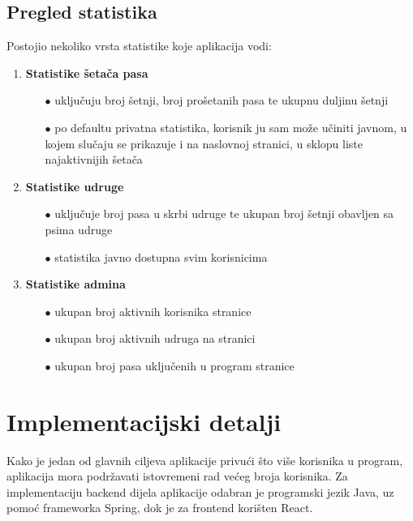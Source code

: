         \subsection{Pregled statistika}
        Postojio nekoliko vrsta statistike koje aplikacija vodi:
            \begin{enumerate}
                \item \textbf{Statistike šetača pasa}
                    \begin{enumerate}
                        \item[$\bullet$] uključuju broj šetnji, broj prošetanih pasa te ukupnu duljinu šetnji
                        \item[$\bullet$] po defaultu privatna statistika, korisnik ju sam može učiniti javnom, u kojem slučaju se prikazuje i na naslovnoj stranici, u sklopu liste najaktivnijih šetača
                    \end{enumerate}
                
                \item \textbf{Statistike udruge}
                    \begin{enumerate}
                        \item[$\bullet$] uključuje broj pasa u skrbi udruge te ukupan broj šetnji obavljen sa psima udruge
                        \item[$\bullet$] statistika javno dostupna svim korisnicima
                    \end{enumerate}
                    
                \item \textbf{Statistike admina}
                    \begin{enumerate}
                        \item[$\bullet$] ukupan broj aktivnih korisnika stranice
                        \item[$\bullet$] ukupan broj aktivnih udruga na stranici
                        \item[$\bullet$] ukupan broj pasa uključenih u program stranice
                    \end{enumerate}
            \end{enumerate}
        
    \section{Implementacijski detalji}
        Kako je jedan od glavnih ciljeva aplikacije privući što više korisnika u program, aplikacija mora podržavati istovremeni rad većeg broja korisnika. Za implementaciju backend dijela aplikacije odabran je programski jezik Java, uz pomoć frameworka Spring, dok je za frontend korišten React.\\
        
